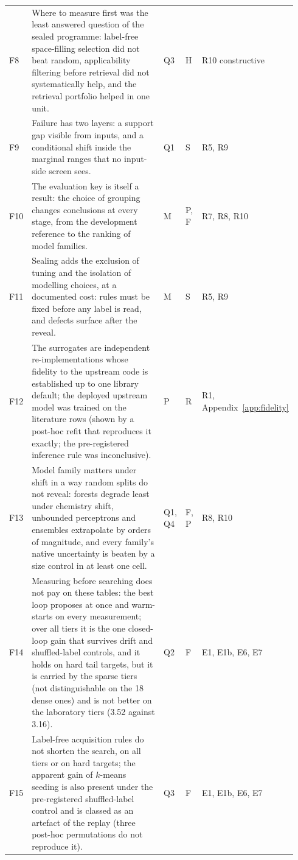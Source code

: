 \documentclass[11pt,a4paper]{article}
\begin{document}
{\begin{longtable}{@{}p{0.04\linewidth}p{0.625\linewidth}p{0.075\linewidth}p{0.055\linewidth}p{0.15\linewidth}@{}}
F8 & Where to measure first was the least answered question of the sealed programme: label-free space-filling selection did not beat random, applicability filtering before retrieval did not systematically help, and the retrieval portfolio helped in one unit. & Q3 & H & R10 constructive \\
F9 & Failure has two layers: a support gap visible from inputs, and a conditional shift inside the marginal ranges that no input-side screen sees. & Q1 & S & R5, R9 \\
F10 & The evaluation key is itself a result: the choice of grouping changes conclusions at every stage, from the development reference to the ranking of model families. & M & P, F & R7, R8, R10 \\
F11 & Sealing adds the exclusion of tuning and the isolation of modelling choices, at a documented cost: rules must be fixed before any label is read, and defects surface after the reveal. & M & S & R5, R9 \\
F12 & The surrogates are independent re-implementations whose fidelity to the upstream code is established up to one library default; the deployed upstream model was trained on the literature rows (shown by a post-hoc refit that reproduces it exactly; the pre-registered inference rule was inconclusive). & P & R & R1, Appendix~\ref{app:fidelity} \\
F13 & Model family matters under shift in a way random splits do not reveal: forests degrade least under chemistry shift, unbounded perceptrons and ensembles extrapolate by orders of magnitude, and every family's native uncertainty is beaten by a size control in at least one cell. & Q1, Q4 & F, P & R8, R10 \\
F14 & Measuring before searching does not pay on these tables: the best loop proposes at once and warm-starts on every measurement; over all tiers it is the one closed-loop gain that survives drift and shuffled-label controls, and it holds on hard tail targets, but it is carried by the sparse tiers (not distinguishable on the 18 dense ones) and is not better on the laboratory tiers (3.52 against 3.16). & Q2 & F & E1, E1b, E6, E7 \\
F15 & Label-free acquisition rules do not shorten the search, on all tiers or on hard targets; the apparent gain of $k$-means seeding is also present under the pre-registered shuffled-label control and is classed as an artefact of the replay (three post-hoc permutations do not reproduce it). & Q3 & F & E1, E1b, E6, E7 \\

\end{longtable}}
\end{document}
